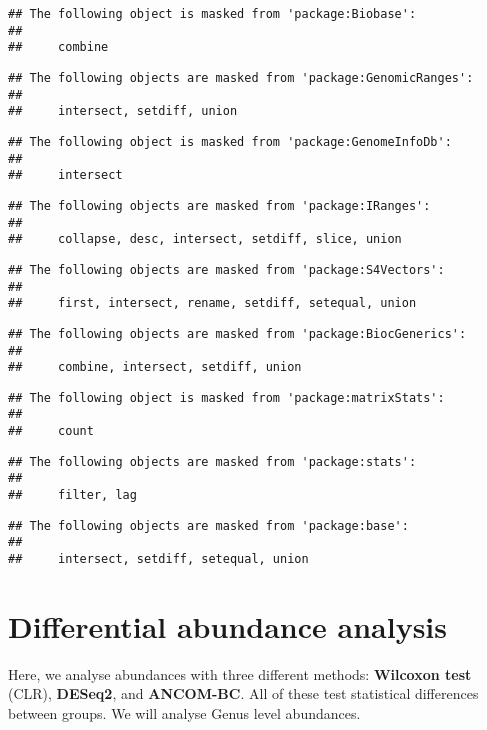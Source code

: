 \documentclass[
  oneside]{book}
\begin{document}
\begin{verbatim}
## The following object is masked from 'package:Biobase':
## 
##     combine
\end{verbatim}

\begin{verbatim}
## The following objects are masked from 'package:GenomicRanges':
## 
##     intersect, setdiff, union
\end{verbatim}

\begin{verbatim}
## The following object is masked from 'package:GenomeInfoDb':
## 
##     intersect
\end{verbatim}

\begin{verbatim}
## The following objects are masked from 'package:IRanges':
## 
##     collapse, desc, intersect, setdiff, slice, union
\end{verbatim}

\begin{verbatim}
## The following objects are masked from 'package:S4Vectors':
## 
##     first, intersect, rename, setdiff, setequal, union
\end{verbatim}

\begin{verbatim}
## The following objects are masked from 'package:BiocGenerics':
## 
##     combine, intersect, setdiff, union
\end{verbatim}

\begin{verbatim}
## The following object is masked from 'package:matrixStats':
## 
##     count
\end{verbatim}

\begin{verbatim}
## The following objects are masked from 'package:stats':
## 
##     filter, lag
\end{verbatim}

\begin{verbatim}
## The following objects are masked from 'package:base':
## 
##     intersect, setdiff, setequal, union
\end{verbatim}

\hypertarget{differential-abundance-analysis}{%
\chapter{Differential abundance analysis}\label{differential-abundance-analysis}}

Here, we analyse abundances with three different methods: \textbf{Wilcoxon test} (CLR), \textbf{DESeq2},
and \textbf{ANCOM-BC}. All of these test statistical differences between groups.
We will analyse Genus level abundances.
\end{document}
